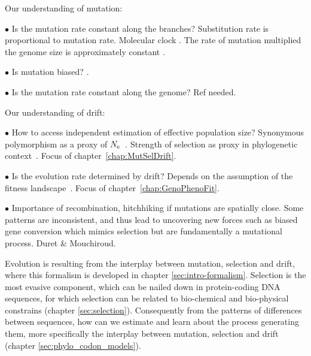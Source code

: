 Our understanding of mutation:

$\bullet$ Is the mutation rate constant along the branches?
Substitution rate is proportional to mutation rate.
Molecular clock \citep{Thorne1998, Lanfear2010a}.
The rate of mutation multiplied the genome size is approximately constant \citep{Drake1991}.

$\bullet$ Is mutation biased? \citep{Singer2000}.

$\bullet$ Is the mutation rate constant along the genome?
Ref needed.

Our understanding of drift:

$\bullet$ How to access independent estimation of effective population size?
Synonymous polymorphism as a proxy of $N_{\textrm{e}}$~\citep{Galtier2016}.
Strength of selection as proxy in phylogenetic context~\citep{Seo2004}.
Focus of chapter~\ref{chap:MutSelDrift}.

$\bullet$ Is the evolution rate determined by drift?
Depends on the assumption of the fitness landscape~\citep{Cherry1998, Goldstein2013}.
Focus of chapter~\ref{chap:GenoPhenoFit}.

$\bullet$ Importance of recombination, hitchhiking if mutations are spatially close.
Some patterns are inconsistent, and thus lead to uncovering new forces such as biased gene conversion which mimics selection but are fundamentally a mutational process.
Duret \& Mouchiroud.

Evolution is resulting from the interplay between mutation, selection and drift, where this formalism is developed in chapter \ref{sec:intro-formalism}.
Selection is the most evasive component, which can be nailed down in protein-coding DNA sequences, for which selection can be related to bio-chemical and bio-physical constrains (chapter \ref{sec:selection}).
Consequently from the patterns of differences between sequences, how can we estimate and learn about the process generating them, more specifically the interplay between mutation, selection and drift (chapter \ref{sec:phylo_codon_models}).
